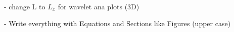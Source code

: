 - change L to $L_x$ for wavelet ana plots (3D)

- Write everything with Equations and Sections like Figures (upper case)

